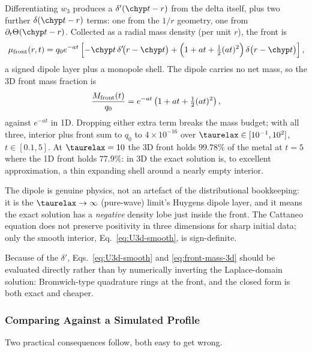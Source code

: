 \begin{remark}
Differentiating $w_3$ produces a $\delta'(\chyp t-r)$ from the delta
itself, plus two further $\delta(\chyp t-r)$ terms: one from the $1/r$
geometry, one from $\partial_t\Theta(\chyp t-r)$. Collected as a radial
mass density (per unit $r$), the front is
\begin{equation}
  \label{eq:front-measure-3d}
  \mu_{\rm front}(r,t) = q_0e^{-at}\left[
    -\chyp t\,\delta'\!\big(r-\chyp t\big)
    +\Big(1+at+\tfrac12(at)^2\Big)\,\delta\big(r-\chyp t\big)\right] ,
\end{equation}
a signed dipole layer plus a monopole shell. The dipole carries no net
mass, so the 3D front mass fraction is
\begin{equation}
  \label{eq:front-mass-3d}
  \frac{M_{\rm front}(t)}{q_0} = e^{-at}\left(1+at+\tfrac12(at)^2\right) ,
\end{equation}
against $e^{-at}$ in 1D. Dropping either extra term breaks the mass
budget; with all three, interior plus front sum to $q_0$ to
$4\times10^{-16}$ over $\taurelax\in[10^{-1},10^2]$, $t\in[0.1,5]$. At
$\taurelax=10$ the 3D front holds $99.78\%$ of the metal at $t=5$ where
the 1D front holds $77.9\%$: in 3D the exact solution is, to excellent
approximation, a thin expanding shell around a nearly empty interior.

The dipole is genuine physics, not an artefact of the distributional
bookkeeping: it is the $\taurelax\to\infty$ (pure-wave) limit's Huygens
dipole layer, and it means the exact solution has a \emph{negative}
density lobe just inside the front. The Cattaneo equation does not
preserve positivity in three dimensions for sharp initial data; only the
smooth interior, Eq.~\eqref{eq:U3d-smooth}, is sign-definite.
\end{remark}

Because of the $\delta'$, Eqs.~\eqref{eq:U3d-smooth} and
\eqref{eq:front-mass-3d} should be evaluated directly rather than by
numerically inverting the Laplace-domain solution: Bromwich-type
quadrature rings at the front, and the closed form is both exact and
cheaper.

\subsubsection{Comparing Against a Simulated Profile}
\label{sec:exact-comparison}

Two practical consequences follow, both easy to get wrong.

